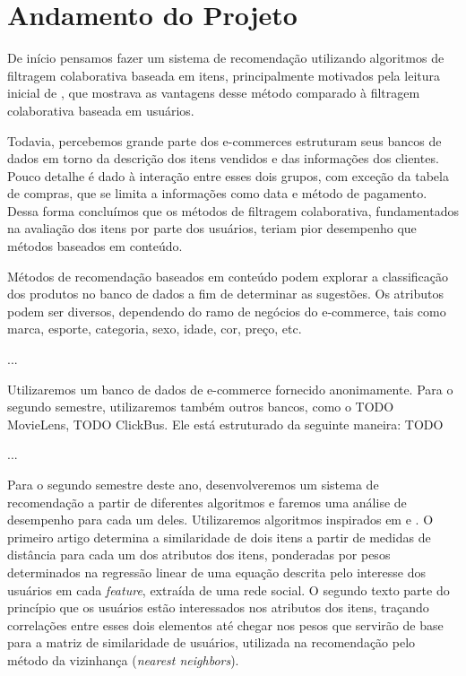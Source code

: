 \chapter[Andamento do Projeto]{Andamento do Projeto}
\label{chap:andamento_do_projeto}


De início pensamos fazer um sistema de recomendação utilizando algoritmos de filtragem colaborativa baseada em itens, principalmente motivados pela leitura inicial de \cite{linden2003amazon}, que mostrava as vantagens desse método comparado à filtragem colaborativa baseada em usuários. 

Todavia, percebemos grande parte dos e-commerces estruturam seus bancos de dados em torno da descrição dos itens vendidos e das informações dos clientes. Pouco detalhe é dado à interação entre esses dois grupos, com exceção da tabela de compras, que se limita a informações como data e método de pagamento. Dessa forma concluímos que os métodos de filtragem colaborativa, fundamentados na avaliação dos itens por parte dos usuários, teriam pior desempenho que métodos baseados em conteúdo.

Métodos de recomendação baseados em conteúdo podem explorar a classificação dos produtos no banco de dados a fim de determinar as sugestões. Os atributos podem ser diversos, dependendo do ramo de negócios do e-commerce, tais como marca, esporte, categoria, sexo, idade, cor, preço, etc.

...

Utilizaremos um banco de dados de e-commerce fornecido anonimamente. Para o segundo semestre, utilizaremos também outros bancos, como o TODO MovieLens, TODO ClickBus. Ele está estruturado da seguinte maneira: TODO 

...


Para o segundo semestre deste ano, desenvolveremos um sistema de recomendação a partir de diferentes algoritmos e faremos uma análise de desempenho  para cada um deles. Utilizaremos algoritmos inspirados em \cite{debnath2008feature} e \cite{symeonidis2007feature}. O primeiro artigo determina a similaridade de dois itens a partir de medidas de distância para cada um dos atributos dos itens, ponderadas por pesos determinados na regressão linear de uma equação descrita pelo interesse dos usuários em cada \textit{feature}, extraída de uma rede social. O segundo texto parte do princípio que os usuários estão interessados nos atributos dos itens, traçando correlações entre esses dois elementos até chegar nos pesos que servirão de base para a matriz de similaridade de usuários, utilizada na recomendação pelo método da vizinhança (\textit{nearest neighbors}).

